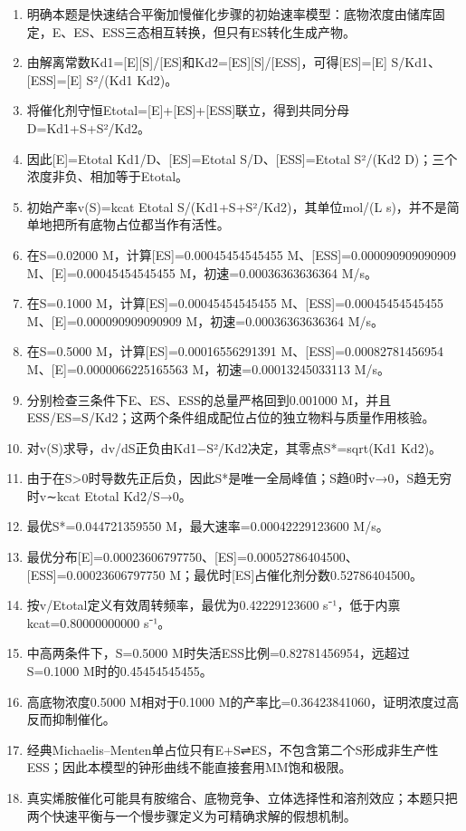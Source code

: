 \documentclass[UTF8,11pt,a4paper]{ctexart}
\begin{document}
\begin{enumerate}
\item 明确本题是快速结合平衡加慢催化步骤的初始速率模型：底物浓度由储库固定，E、ES、ESS三态相互转换，但只有ES转化生成产物。
\item 由解离常数Kd1=[E][S]/[ES]和Kd2=[ES][S]/[ESS]，可得[ES]=[E] S/Kd1、[ESS]=[E] S²/(Kd1 Kd2)。
\item 将催化剂守恒Etotal=[E]+[ES]+[ESS]联立，得到共同分母D=Kd1+S+S²/Kd2。
\item 因此[E]=Etotal Kd1/D、[ES]=Etotal S/D、[ESS]=Etotal S²/(Kd2 D)；三个浓度非负、相加等于Etotal。
\item 初始产率v(S)=kcat Etotal S/(Kd1+S+S²/Kd2)，其单位mol/(L s)，并不是简单地把所有底物占位都当作有活性。
\item 在S=0.02000 M，计算[ES]=0.00045454545455 M、[ESS]=0.000090909090909 M、[E]=0.00045454545455 M，初速=0.00036363636364 M/s。
\item 在S=0.1000 M，计算[ES]=0.00045454545455 M、[ESS]=0.00045454545455 M、[E]=0.000090909090909 M，初速=0.00036363636364 M/s。
\item 在S=0.5000 M，计算[ES]=0.00016556291391 M、[ESS]=0.00082781456954 M、[E]=0.0000066225165563 M，初速=0.00013245033113 M/s。
\item 分别检查三条件下E、ES、ESS的总量严格回到0.001000 M，并且ESS/ES=S/Kd2；这两个条件组成配位占位的独立物料与质量作用核验。
\item 对v(S)求导，dv/dS正负由Kd1−S²/Kd2决定，其零点S*=sqrt(Kd1 Kd2)。
\item 由于在S>0时导数先正后负，因此S*是唯一全局峰值；S趋0时v→0，S趋无穷时v∼kcat Etotal Kd2/S→0。
\item 最优S*=0.044721359550 M，最大速率=0.00042229123600 M/s。
\item 最优分布[E]=0.00023606797750、[ES]=0.00052786404500、[ESS]=0.00023606797750 M；最优时[ES]占催化剂分数0.52786404500。
\item 按v/Etotal定义有效周转频率，最优为0.42229123600 s⁻¹，低于内禀kcat=0.80000000000 s⁻¹。
\item 中高两条件下，S=0.5000 M时失活ESS比例=0.82781456954，远超过S=0.1000 M时的0.45454545455。
\item 高底物浓度0.5000 M相对于0.1000 M的产率比=0.36423841060，证明浓度过高反而抑制催化。
\item 经典Michaelis–Menten单占位只有E+S⇌ES，不包含第二个S形成非生产性ESS；因此本模型的钟形曲线不能直接套用MM饱和极限。
\item 真实烯胺催化可能具有胺缩合、底物竞争、立体选择性和溶剂效应；本题只把两个快速平衡与一个慢步骤定义为可精确求解的假想机制。
\end{enumerate}
\end{document}
